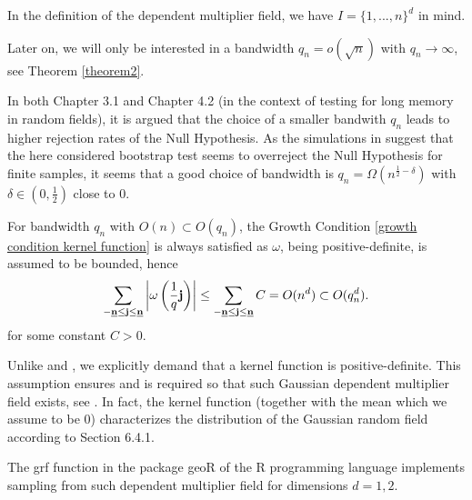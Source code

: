 \begin{remark} \label{remark:kernel and dependent multiplier field}
    \begin{aufzii}
        \item In the definition of the dependent multiplier field, we have $I = \{1, ..., n\}^d$ in mind.
        \item Later on, we will only be interested in a bandwidth $q_n = o(\sqrt{n})$ with $q_n \to \infty$, see Theorem \ref{theorem2}.
        \item In both \cite{[8]BUCCHIA2015104} Chapter 3.1 and \cite{[33]lavancier2008VStest} Chapter 4.2 (in the context of testing for long memory in random fields), it is argued that the choice of a smaller bandwith $q_n$ leads to higher rejection rates of the Null Hypothesis. As the simulations in \cite{[0]BUCCHIA2017344} suggest that the here considered bootstrap test seems to overreject the Null Hypothesis for finite samples, it seems that a good choice of bandwidth is $q_n = \Omega(n^{\frac{1}{2}-\delta})$ with $\delta \in (0, \frac{1}{2})$ close to $0$.
        \item For bandwidth $q_n$ with $O(n) \subset O(q_n)$, the Growth Condition \eqref{growth condition kernel function} is always satisfied as $\omega$, being positive-definite, is assumed to be bounded, hence \[ \sum\limits_{-\usbf[n] \leq \mathbf{j} \leq \usbf[n]} \left|\omega\left(\frac{1}{q} \mathbf{j}\right)\right| \leq \sum\limits_{-\usbf[n] \leq \mathbf{j} \leq \usbf[n]} C = O(n^d) \subset O(q_n^d). \] for some constant $C > 0$.
        \item Unlike \cite{[8]BUCCHIA2015104} and \cite{[0]BUCCHIA2017344}, we explicitly demand that a kernel function is positive-definite. This assumption ensures and is required so that such Gaussian dependent multiplier field exists, see \cite{schlather2012constructioncovariancefunction}. In fact, the kernel function (together with the mean which we assume to be $0$) characterizes the distribution of the Gaussian random field according to \cite{bishop2006pattern} Section 6.4.1.
        \item The grf function in the package geoR \cite{geoR} of the R programming language implements sampling from such dependent multiplier field for dimensions $d = 1, 2$.
    \end{aufzii}
\end{remark}

